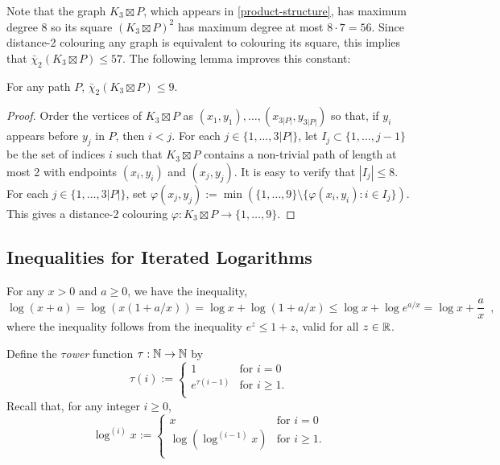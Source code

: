 \documentclass[kpfonts]{patmorin}
\newcommand{\dtcn}{\bar{\chi}_2}
\theoremstyle{named}
\begin{document}
Note that the graph $K_3\boxtimes P$, which appears in \cref{product-structure}, has maximum degree 8 so its square $(K_3\boxtimes P)^2$ has maximum degree at most $8\cdot 7=56$.  Since distance-2 colouring any graph is equivalent to colouring its square, this implies that $\dtcn(K_3\boxtimes P)\le 57$. The following lemma improves this constant:

\begin{lem}\label{dumb}
    For any path $P$, $\dtcn(K_3\boxtimes P)\le 9$.
\end{lem}

\begin{proof}
    Order the vertices of $K_3\boxtimes P$ as $(x_1,y_1),\ldots,(x_{3|P|},y_{3|P|})$ so that, if $y_i$ appears before $y_j$ in $P$, then $i<j$. For each $j\in\{1,\ldots,3|P|\}$, let $I_j\subset\{1,\ldots,j-1\}$ be the set of indices $i$ such that $K_3\boxtimes P$ contains a non-trivial path of length at most 2 with endpoints $(x_i,y_i)$ and $(x_j,y_j)$.  It is easy to verify that $|I_j|\le 8$.  For each $j\in\{1,\ldots,3|P|\}$, set $\varphi(x_j,y_j):=\min(\{1,\ldots,9\}\setminus\{\varphi(x_i,y_i):i\in I_j\})$.  This gives a distance-2 colouring $\varphi:K_3\boxtimes P\to\{1,\ldots,9\}$.
\end{proof}


\subsection{Inequalities for Iterated Logarithms}

For any $x> 0$ and $a\ge 0$, we have the inequality,
\begin{equation}
    \log (x+a) = \log (x(1+a/x)) = \log x + \log(1+a/x) \le \log x + \log e^{a/x} = \log x + \frac{a}{x} \enspace , \label{log-x-plus-a}
\end{equation}
where the inequality follows from the inequality $e^z \le 1+z$, valid for all $z\in\mathbb{R}$.

Define the \emph{$\tau$ower} function $\tau:\mathbb{N}\to\mathbb{N}$ by
\[
  \tau(i) :=
    \begin{cases}
        1 & \text{for $i=0$} \\
        e^{\tau(i-1)} & \text{for $i\ge 1$.} \\
    \end{cases}
\]
Recall that, for any integer $i\ge 0$,
\[
    \log^{(i)} x :=
      \begin{cases}
          x & \text{for $i=0$} \\
          \log\left(\log^{(i-1)}x\right) & \text{for $i\ge 1$.} \\
      \end{cases}
\]
\end{document}
